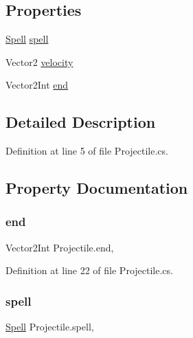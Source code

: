 \subsection*{Properties}
\begin{DoxyCompactItemize}
\item 
\mbox{\hyperlink{class_spell}{Spell}} \mbox{\hyperlink{class_projectile_adf481201408f58e0fe934bfe0e47229f}{spell}}
\item 
Vector2 \mbox{\hyperlink{class_projectile_a2d9755facfa238e047de85c626587cd2}{velocity}}
\item 
Vector2\+Int \mbox{\hyperlink{class_projectile_a488a27f52325780f1315b5c64949d9ca}{end}}
\end{DoxyCompactItemize}


\subsection{Detailed Description}


Definition at line 5 of file Projectile.\+cs.



\subsection{Property Documentation}
\mbox{\label{class_projectile_a488a27f52325780f1315b5c64949d9ca}} 
\subsubsection{\texorpdfstring{end}{end}}
{\footnotesize\ttfamily Vector2\+Int Projectile.\+end\hspace{0.3cm}{\ttfamily [get]}, {\ttfamily [set]}}



Definition at line 22 of file Projectile.\+cs.

\mbox{\label{class_projectile_adf481201408f58e0fe934bfe0e47229f}} 
\subsubsection{\texorpdfstring{spell}{spell}}
{\footnotesize\ttfamily \mbox{\hyperlink{class_spell}{Spell}} Projectile.\+spell\hspace{0.3cm}{\ttfamily [get]}, {\ttfamily [set]}}



